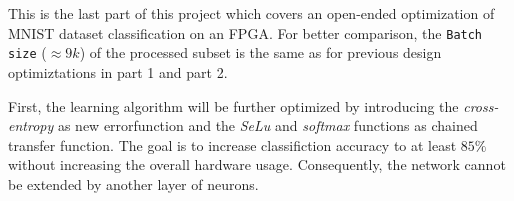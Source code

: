 \documentclass[../main.tex]{subfiles}
\begin{document}
This is the last part of this project which covers an open-ended optimization of MNIST dataset classification on an FPGA. 
For better comparison, the \texttt{Batch size} ($\approx 9k$) of the processed subset is the same as for previous design optimiztations in part 1 and part 2.

First, the learning algorithm will be further optimized by introducing the \textit{cross-entropy} as new errorfunction and the \textit{SeLu} and \textit{softmax} functions as chained transfer function. The goal is to increase classifiction accuracy to at least $85\percent$ without increasing the overall hardware usage.
Consequently, the network cannot be extended by another layer of neurons. 
\end{document}
